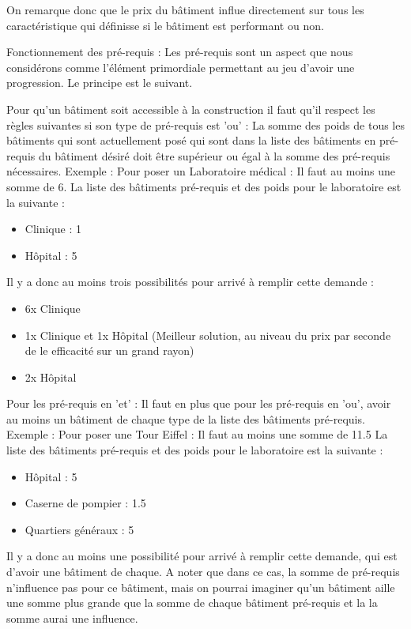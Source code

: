\documentclass[a4paper,10pt,openany,oneside]{report}
\begin{document}
On remarque donc que le prix du bâtiment influe directement sur tous les caractéristique qui définisse si le bâtiment est performant ou non.

Fonctionnement des pré-requis :
Les pré-requis sont un aspect que nous considérons comme l'élément primordiale permettant au jeu d'avoir une progression. Le principe est le suivant.

Pour qu'un bâtiment soit accessible à la construction il faut qu'il respect les règles suivantes si son type de pré-requis est 'ou' :
La somme des poids de tous les bâtiments qui sont actuellement posé qui sont dans la liste des bâtiments en pré-requis du bâtiment désiré doit être supérieur ou égal à la somme des pré-requis nécessaires.
Exemple :
Pour poser un Laboratoire médical : Il faut au moins une somme de 6.
La liste des bâtiments pré-requis et des poids pour le laboratoire est la suivante :
\begin{itemize}
	\item Clinique : 1
	\item Hôpital : 5
\end{itemize}
Il y a donc au moins trois possibilités pour arrivé à remplir cette demande :
\begin{itemize}
	\item 6x Clinique
	\item 1x Clinique et 1x Hôpital (Meilleur solution, au niveau du prix par seconde de le efficacité sur un grand rayon)
	\item 2x Hôpital
\end{itemize}

Pour les pré-requis en 'et' :
Il faut en plus que pour les pré-requis en 'ou', avoir au moins un bâtiment de chaque type de la liste des bâtiments pré-requis.
Exemple :
Pour poser une Tour Eiffel : Il faut au moins une somme de 11.5
La liste des bâtiments pré-requis et des poids pour le laboratoire est la suivante :
\begin{itemize}
	\item Hôpital : 5
	\item Caserne de pompier : 1.5
	\item Quartiers généraux : 5
\end{itemize}
Il y a donc au moins une possibilité pour arrivé à remplir cette demande, qui est d'avoir une bâtiment de chaque. A noter que dans ce cas, la somme de pré-requis n'influence pas pour ce bâtiment, mais on pourrai imaginer qu'un bâtiment aille une somme plus grande que la somme de chaque bâtiment pré-requis et la la somme aurai une influence.
\end{document}
